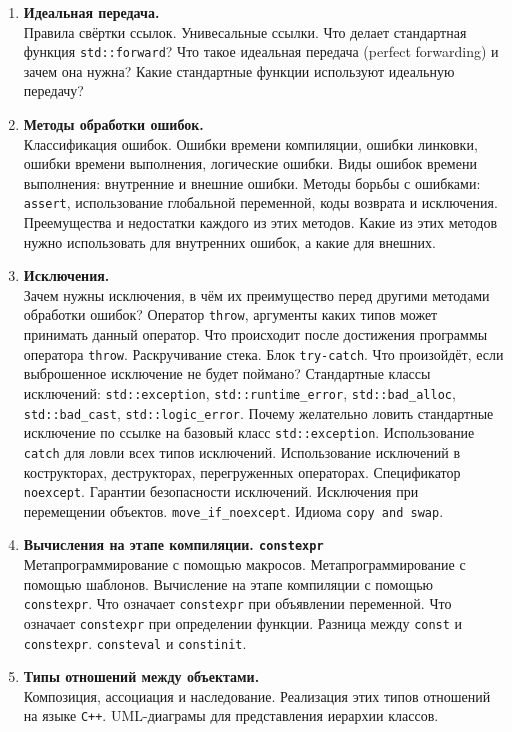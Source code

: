 \documentclass{article}
\begin{document}
\begin{enumerate}
\item \textbf{Идеальная передача.}\\
Правила свёртки ссылок. Унивесальные ссылки. Что делает стандартная функция \texttt{std::forward}? Что такое идеальная передача (perfect forwarding) и зачем она нужна? Какие стандартные функции используют идеальную передачу?

\item \textbf{Методы обработки ошибок.}\\
Классификация ошибок. Ошибки времени компиляции, ошибки линковки, ошибки времени выполнения, логические ошибки.
Виды ошибок времени выполнения: внутренние и внешние ошибки. Методы борьбы с ошибками: \texttt{assert}, использование глобальной переменной, коды возврата и исключения. Преемущества и недостатки каждого из этих методов. Какие из этих методов нужно использовать для внутренних ошибок, а какие для внешних.


\item \textbf{Исключения.}\\
Зачем нужны исключения, в чём их преимущество перед другими методами обработки ошибок?
Оператор \texttt{throw}, аргументы каких типов может принимать данный оператор. Что происходит после достижения программы оператора \texttt{throw}. Раскручивание стека. Блок \texttt{try-catch}. Что произойдёт, если выброшенное исключение не будет поймано? Стандартные классы исключений: \texttt{std::exception}, \texttt{std::runtime\_error}, \texttt{std::bad\_alloc}, \texttt{std::bad\_cast}, \texttt{std::logic\_error}. Почему желательно ловить стандартные исключение по ссылке на базовый класс \texttt{std::exception}. Использование \texttt{catch} для ловли всех типов исключений. Использование исключений в кострукторах, деструкторах, перегруженных операторах. Спецификатор \texttt{noexcept}. Гарантии безопасности исключений. Исключения при перемещении объектов. \texttt{move\_if\_noexcept}. Идиома \texttt{copy and swap}.


\item \textbf{Вычисления на этапе компиляции. \texttt{constexpr}} \\
Метапрограммирование с помощью макросов. Метапрограммирование с помощью шаблонов. Вычисление на этапе компиляции с помощью \texttt{constexpr}. Что означает \texttt{constexpr} при объявлении переменной. Что означает \texttt{constexpr} при определении функции. Разница между \texttt{const} и \texttt{constexpr}. \texttt{consteval} и \texttt{constinit}.

\item \textbf{Типы отношений между объектами.}\\
Композиция, ассоциация и наследование. Реализация этих типов отношений на языке \texttt{C++}. UML-диаграмы для представления иерархии классов.



\end{enumerate}
\end{document}
